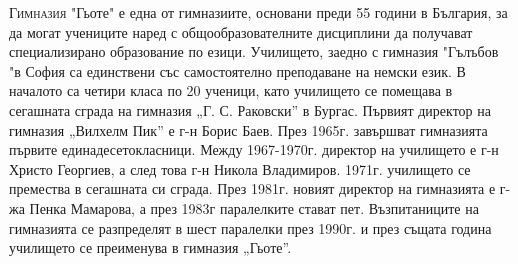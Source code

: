\begin{multicols}{3}
\noindent \lettrine[lraise=0.2, nindent=0em, slope=-.5em]{Г}{имназия} "Гьоте" е една от гимназиите, основани преди 55 години в България, за да могат  учениците  наред с общообразователните дисциплини да получават специализирано образование по езици. Училището, заедно с гимназия "Гълъбов "в София са единствени със самостоятелно преподаване на немски език.
В началото са четири класа по 20 ученици, като училището се помещава в сегашната сграда на гимназия „Г. С. Раковски” в Бургас. Първият директор на гимназия „Вилхелм Пик” е г-н Борис Баев. През 1965г. завършват гимназията първите единадесетокласници. Между 1967-1970г. директор на училището е г-н Христо Георгиев, а след това г-н Никола Владимиров. 1971г. училището се премества в 
сегашната си сграда. През 1981г. новият директор на гимназията е г-жа Пенка Мамарова, а през 1983г паралелките стават пет. Възпитаниците на гимназията се разпределят в шест паралелки през 1990г. и през същата година училището се преименува в гимназия „Гьоте”. 

\vspace{-5cm}


\end{multicols}

